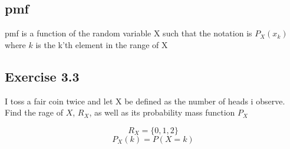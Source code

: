 \subsection*{\acrfull{pmf}}
\acrshort{pmf} is a function of the random variable X such that the notation is $P_X(x_k)$ where $k$ is the k'th element in the range of X
\subsection*{Exercise 3.3}
I toss a fair coin twice and let X be defined as the number of heads i observe. Find the rage of $X$, $R_X$, as well as its probability mass function $P_X$

$$R_X=\{0, 1, 2\}$$
$$P_X(k)=P(X=k)$$